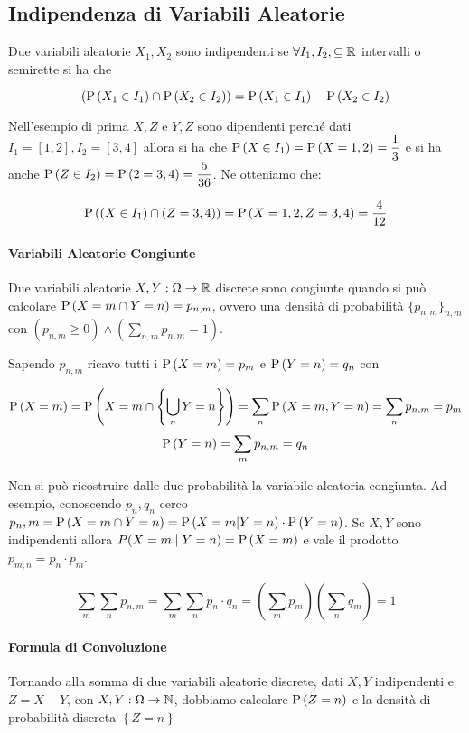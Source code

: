 \subsection{Indipendenza di Variabili Aleatorie}

Due variabili aleatorie $ X_1, X_2 $ sono indipendenti se $ \forall I_1, I_2, \subseteq \mathbb{R} $ intervalli o semirette si ha che 

\[ \left( \text{P}\left(X_1 \in I_1\right) \cap \text{P}\left(X_2 \in I_2\right) \right) = \text{P}\left(X_1 \in I_1\right) - \text{P}\left(X_2 \in I_2\right) \]

Nell'esempio di prima $ X, Z $ e $ Y,Z $ sono dipendenti perché dati $ I_1 = [1,2], I_2 = [3,4] $ allora si ha che $ \text{P}\left(X\in I_1\right) = \text{P}\left(X=1,2\right) = \dfrac{1}{3} $ e si ha anche $ \text{P}\left(Z \in I_2\right) = \text{P}\left(2 = 3,4\right) = \dfrac{5}{36} $. Ne otteniamo che:


\[ \text{P}\left((X \in I_1) \cap (Z = 3,4)\right) = \text{P}\left(X = 1,2, Z = 3,4\right) = \dfrac{4}{12} \]

\paragraph{Variabili Aleatorie Congiunte}
Due variabili aleatorie $ X,Y : \Omega \to \mathbb{R} $ discrete sono congiunte quando si può calcolare $ \text{P}\left(X = m \cap Y = n\right) = p_{n,m} $, ovvero una densità di probabilità $ \{ p_{n,m} \}_{n,m} $ con $ (p_{n,m} \geq 0 ) \land (\sum_{n,m} p_{n,m} = 1) $.

Sapendo $ p_{n,m} $ ricavo tutti i $ \text{P}\left(X=m\right) = p_m $ e $ \text{P}\left(Y = n\right) = q_n $ con

\[ \text{P}\left(X=m\right) = \text{P}\left(X = m \cap \left\{ \bigcup_{n} Y=n \right\}\right) = \sum_{n} \text{P}\left(X=m,Y=n\right) = \sum_n p_{n,m} = p_m \]
\[ \text{P}\left(Y=n\right) = \sum_{m} p_{n,m} = q_n \]

Non si può ricostruire dalle due probabilità la variabile aleatoria congiunta. Ad esempio, conoscendo $ p_n,q_n $ cerco $ p_n,m  = \text{P}\left(X = m \cap Y = n\right) = \text{P}\left(X = m | Y = n\right) \cdot \text{P}\left(Y=n\right) $. Se $ X,Y $ sono indipendenti allora $ P(X=m \mid Y=n) = \text{P}\left(X=m\right) $ e vale il prodotto $ p_{m,n} = p_n \cdot p_m $.

\[ \sum_{m}\sum_{n} p_{n,m} = \sum_{m}\sum_{n} p_n \cdot q_n = \left( \sum_{m} p_m \right) \left( \sum_{n} q_m \right) = 1 \]

\paragraph{Formula di Convoluzione}

Tornando alla somma di due variabili aleatorie discrete, dati $ X,Y $ indipendenti e $ Z = X + Y $, con $ X,Y : \Omega \to \mathbb{N} $, dobbiamo calcolare $ \text{P}\left(Z = n\right) $ e la densità di probabilità discreta $ \left\{Z = n\right\} $

